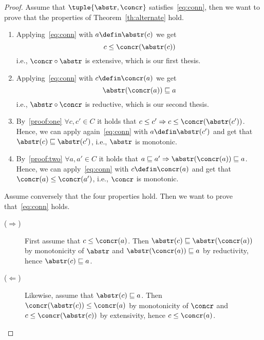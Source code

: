 \begin{proof}
  Assume that \(\tuple{\abstr,\concr}\) satisfies~\eqref{eq:conn},
  then we want to prove that the properties of
  Theorem~\ref{th:alternate} hold.
  \begin{enumerate}[label=(\arabic*)]
  \item\label{proof:one} Applying~\eqref{eq:conn} with
    \(a \defin \abstr(c)\) we get
    \begin{equation}
      c \leq \concr(\abstr(c))
    \end{equation}
    i.e., \(\concr \circ\abstr\) is extensive, which is our first
    thesis.
  \item\label{proof:two} Applying~\eqref{eq:conn} with
    \(c \defin\concr(a)\) we get
    \begin{equation}
      \abstr(\concr(a)) \sqsubseteq a
    \end{equation}
    i.e., \(\abstr\circ\concr\) is reductive, which is our second
    thesis.
  \item By~\ref{proof:one} \(\forall c, c'\in C\) it holds that
    \(c \leq c' \Rightarrow c \leq \concr(\abstr(c'))\). Hence, we can
    apply again~\eqref{eq:conn} with \(a \defin \abstr(c')\) and get
    that \(\abstr(c) \sqsubseteq \abstr(c')\), i.e., \(\abstr\) is
    monotonic.
  \item By~\ref{proof:two} \(\forall a, a'\in C\) it holds that
    \(a \sqsubseteq a' \Rightarrow \abstr(\concr(a)) \sqsubseteq
    a\). Hence, we can apply~\eqref{eq:conn} with
    \(c \defin \concr(a)\) and get that
    \(\concr(a)\leq\concr(a')\), i.e., \(\concr\) is
    monotonic.
  \end{enumerate}

  Assume conversely that the four properties hold. Then we want to
  prove that~\eqref{eq:conn} holds.
  \begin{description}
  \item[(\(\Rightarrow\))] First assume that \(c \leq
    \concr(a)\). Then \(\abstr(c) \sqsubseteq \abstr(\concr(a))\) by
    monotonicity of \(\abstr\) and \(\abstr(\concr(a)) \sqsubseteq a\)
    by reductivity, hence \(\abstr(c) \sqsubseteq a\).
  \item[(\(\Leftarrow\))] Likewise, assume that
    \(\abstr(c) \sqsubseteq a\). Then
    \(\concr(\abstr(c)) \leq \concr(a)\) by monotonicity of \(\concr\)
    and \(c \leq \concr(\abstr(c))\) by extensivity, hence
    \(c \leq \concr(a)\).
  \end{description}
\end{proof}


